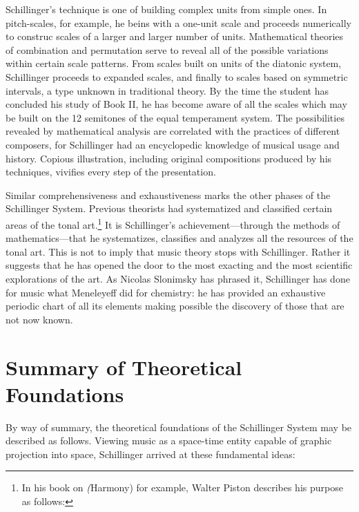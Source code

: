 Schillinger's technique is one of building complex units from simple ones. In
pitch-scales, for example, he beins with a one-unit scale and proceeds
numerically to construc scales of a larger and larger number of units.
Mathematical theories of combination and permutation serve to reveal all of the
possible variations within certain scale patterns. From scales built on units
of the diatonic system, Schillinger proceeds to expanded scales, and finally to
scales based on symmetric intervals, a type unknown in traditional theory. By
the time the student has concluded his study of Book II, he has become aware of
all the scales which may be built on the 12 semitones of the equal temperament
system. The possibilities revealed by mathematical analysis are correlated with
the practices of different composers, for Schillinger had an encyclopedic
knowledge of musical usage and history. Copious illustration, including
original compositions produced by his techniques, vivifies every step of the
presentation.

Similar comprehensiveness and exhaustiveness marks the other phases of the
Schillinger System. Previous theorists had systematized and classified certain
areas of the tonal art.\footnote{In his book on \textit(Harmony) for example,
Walter Piston describes his purpose as follows: } It is Schillinger's achievement---through the methods of
mathematics---that he systematizes, classifies and analyzes all the resources
of the tonal art. This is not to imply that music theory stops with
Schillinger. Rather it suggests that he has opened the door to the most
exacting and the most scientific explorations of the art. As Nicolas Slonimsky
has phrased it, Schillinger has done for music what Meneleyeff did for
chemistry: he has provided an exhaustive periodic chart of all its elements
making possible the discovery of those that are not now known.

\section{Summary of Theoretical Foundations}

By way of summary, the theoretical foundations of the Schillinger System may be described as follows. Viewing music as a space-time entity capable of graphic projection into space, Schillinger arrived at these fundamental ideas:

